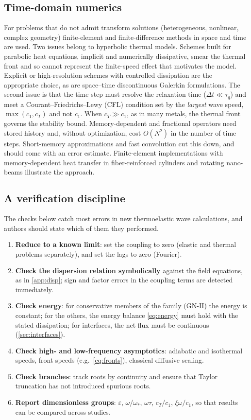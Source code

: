 \subsection{Time-domain numerics}
For problems that do not admit transform solutions (heterogeneous, nonlinear, complex geometry) finite-element and finite-difference methods in space and time are used. Two issues belong to hyperbolic thermal models. Schemes built for parabolic heat equations, implicit and numerically dissipative, smear the thermal front and so cannot represent the finite-speed effect that motivates the model. Explicit or high-resolution schemes with controlled dissipation are the appropriate choice, as are space--time discontinuous Galerkin formulations. The second issue is that the time step must resolve the relaxation time ($\Delta t\ll\tau_q$) and meet a Courant--Friedrichs--Lewy (CFL) condition set by the \emph{largest} wave speed, $\max(c_1,c_T)$ and not $c_1$. When $c_T\gg c_1$, as in many metals, the thermal front governs the stability bound. Memory-dependent and fractional operators need stored history and, without optimization, cost $O(N^2)$ in the number of time steps. Short-memory approximations and fast convolution cut this down, and should come with an error estimate. Finite-element implementations with memory-dependent heat transfer in fiber-reinforced cylinders \citep{Sur2019} and rotating nano-beams \citep{Sur2025} illustrate the approach.

\subsection{A verification discipline}
The checks below catch most errors in new thermoelastic wave calculations, and authors should state which of them they performed.
\begin{enumerate}
\item \textbf{Reduce to a known limit}: set the coupling to zero (elastic and thermal problems separately), and set the lags to zero (Fourier).
\item \textbf{Check the dispersion relation symbolically} against the field equations, as in \cref{app:disp}; sign and factor errors in the coupling terms are detected immediately.
\item \textbf{Check energy}: for conservative members of the family (GN-II) the energy is constant; for the others, the energy balance \eqref{eq:energy} must hold with the stated dissipation; for interfaces, the net flux must be continuous (\cref{sec:interfaces}).
\item \textbf{Check high- and low-frequency asymptotics}: adiabatic and isothermal speeds, front speeds (e.g.\ \eqref{eq:fronts}), classical diffusive scaling.
\item \textbf{Check branches}: track roots by continuity and ensure that Taylor truncation has not introduced spurious roots.
\item \textbf{Report dimensionless groups}: $\varepsilon$, $\omega/\omega_*$, $\omega\tau$, $c_T/c_1$, $\xi\omega/c_1$, so that results can be compared across studies.
\end{enumerate}


